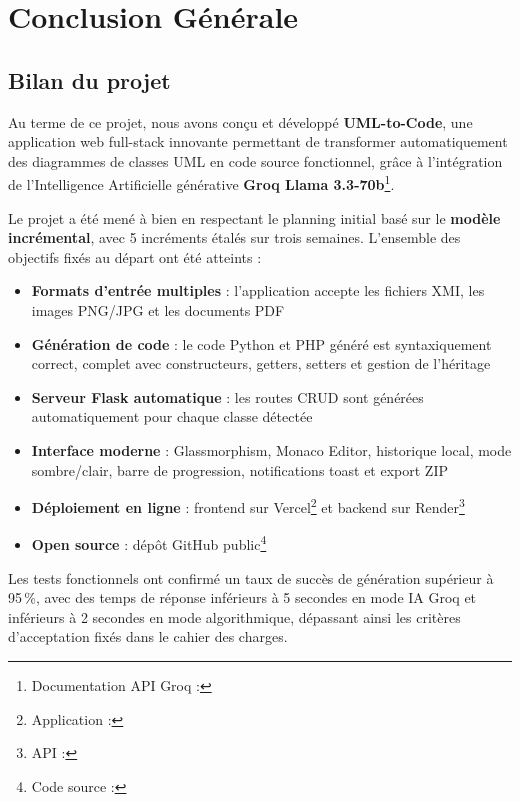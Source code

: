 \chapter*{Conclusion Générale}

\section*{Bilan du projet}

Au terme de ce projet, nous avons conçu et développé \textbf{UML-to-Code}, une application web full-stack innovante permettant de transformer automatiquement des diagrammes de classes UML en code source fonctionnel, grâce à l'intégration de l'Intelligence Artificielle générative \textbf{Groq Llama 3.3-70b}\footnote{Documentation API Groq : }.

Le projet a été mené à bien en respectant le planning initial basé sur le \textbf{modèle incrémental}, avec 5 incréments étalés sur trois semaines. L'ensemble des objectifs fixés au départ ont été atteints :

\begin{itemize}
    \item \textbf{Formats d'entrée multiples} : l'application accepte les fichiers XMI, les images PNG/JPG et les documents PDF
    \item \textbf{Génération de code} : le code Python et PHP généré est syntaxiquement correct, complet avec constructeurs, getters, setters et gestion de l'héritage
    \item \textbf{Serveur Flask automatique} : les routes CRUD sont générées automatiquement pour chaque classe détectée
    \item \textbf{Interface moderne} : Glassmorphism, Monaco Editor, historique local, mode sombre/clair, barre de progression, notifications toast et export ZIP
    \item \textbf{Déploiement en ligne} : frontend sur Vercel\footnote{Application : } et backend sur Render\footnote{API : }
    \item \textbf{Open source} : dépôt GitHub public\footnote{Code source : }
\end{itemize}

Les tests fonctionnels ont confirmé un taux de succès de génération supérieur à 95\,\%, avec des temps de réponse inférieurs à 5 secondes en mode IA Groq et inférieurs à 2 secondes en mode algorithmique, dépassant ainsi les critères d'acceptation fixés dans le cahier des charges.


